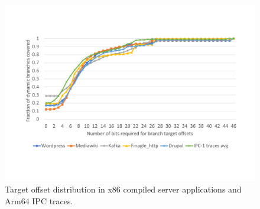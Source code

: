 

\begin{figure}
\centering
\includegraphics[width=\columnwidth, trim=70 90 60 100, clip]{figures/x86-IPC.pdf}
\caption{Target offset distribution in x86 compiled server applications and Arm64 IPC traces.}
\label{fig:x86_res}
\end{figure}
